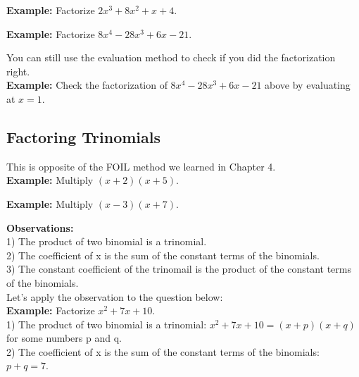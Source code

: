 \documentclass{ximera}
\begin{document}
{\bf Example:} Factorize $2x^3 + 8x^2 + x +4$.\\
\vspace{3 cm}

{\bf Example:} Factorize $8x^4 - 28x^3 + 6x - 21$.\\
\vspace{3 cm}

You can still use the evaluation method to check if you did the factorization right.\\

{\bf Example:} Check the factorization of $8x^4 - 28x^3 + 6x - 21$ above by evaluating at $x = 1$.\\
\vspace{3 cm}


 
\subsection{Factoring Trinomials}

This is opposite of the FOIL method we learned in Chapter 4. \\

{\bf Example:} Multiply $(x+2)(x+5)$.\\
\vspace{2 cm}

{\bf Example:} Multiply $(x-3)(x+7)$.\\
\vspace{2 cm}

{\bf Observations:}\\

1) The product of two binomial is a trinomial.\\

2) The coefficient of x is the sum of the constant terms of the binomials.\\

3) The constant coefficient of the trinomail is the product of the constant terms of the binomials.\\

Let's apply the observation to the question below:\\

{\bf Example:} Factorize $x^2 + 7x +10$.\\

1) The product of two binomial is a trinomial: $x^2 + 7x +10 = (x + p) (x + q)$ for some numbers p and q. \\

2) The coefficient of x is the sum of the constant terms of the binomials: $ p + q = 7$.\\
\end{document}
